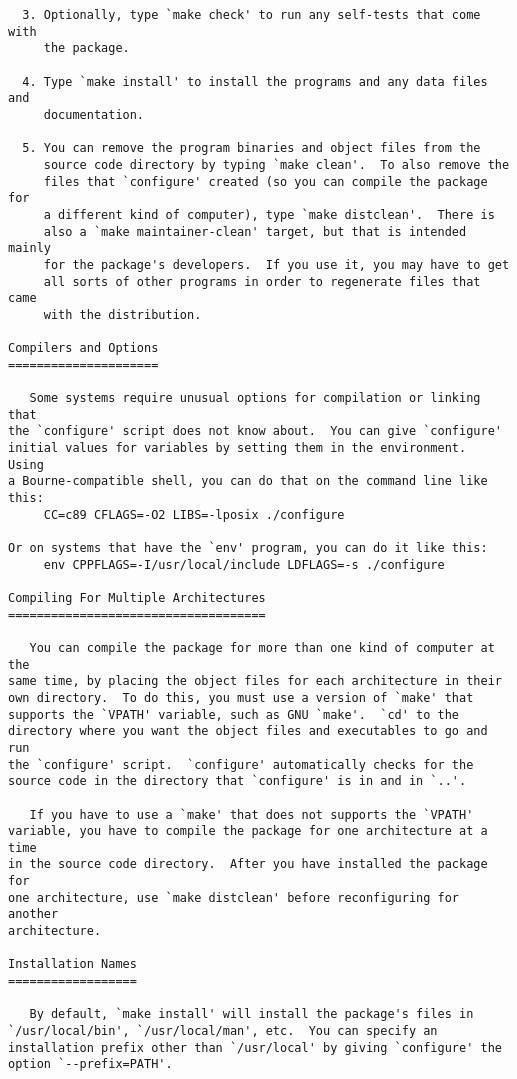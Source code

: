 \begin{verbatim}
  3. Optionally, type `make check' to run any self-tests that come with
     the package.

  4. Type `make install' to install the programs and any data files and
     documentation.

  5. You can remove the program binaries and object files from the
     source code directory by typing `make clean'.  To also remove the
     files that `configure' created (so you can compile the package for
     a different kind of computer), type `make distclean'.  There is
     also a `make maintainer-clean' target, but that is intended mainly
     for the package's developers.  If you use it, you may have to get
     all sorts of other programs in order to regenerate files that came
     with the distribution.

Compilers and Options
=====================

   Some systems require unusual options for compilation or linking that
the `configure' script does not know about.  You can give `configure'
initial values for variables by setting them in the environment.  Using
a Bourne-compatible shell, you can do that on the command line like
this:
     CC=c89 CFLAGS=-O2 LIBS=-lposix ./configure

Or on systems that have the `env' program, you can do it like this:
     env CPPFLAGS=-I/usr/local/include LDFLAGS=-s ./configure

Compiling For Multiple Architectures
====================================

   You can compile the package for more than one kind of computer at the
same time, by placing the object files for each architecture in their
own directory.  To do this, you must use a version of `make' that
supports the `VPATH' variable, such as GNU `make'.  `cd' to the
directory where you want the object files and executables to go and run
the `configure' script.  `configure' automatically checks for the
source code in the directory that `configure' is in and in `..'.

   If you have to use a `make' that does not supports the `VPATH'
variable, you have to compile the package for one architecture at a time
in the source code directory.  After you have installed the package for
one architecture, use `make distclean' before reconfiguring for another
architecture.

Installation Names
==================

   By default, `make install' will install the package's files in
`/usr/local/bin', `/usr/local/man', etc.  You can specify an
installation prefix other than `/usr/local' by giving `configure' the
option `--prefix=PATH'.


\end{verbatim}
